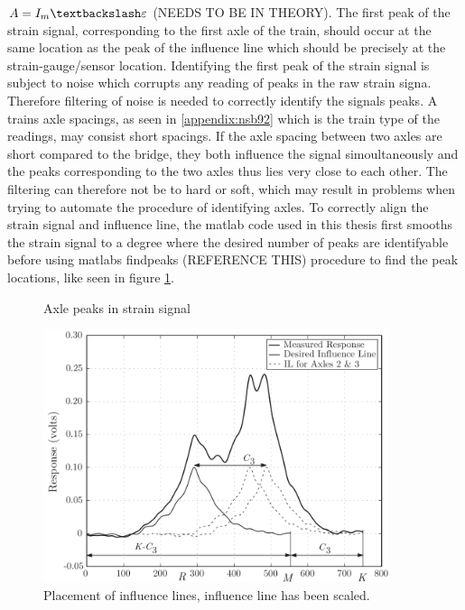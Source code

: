 $A = I_m \textbackslash \varepsilon$
(NEEDS TO BE IN THEORY).
The first peak of the strain signal, corresponding to the first axle of the train, should occur at the same location as the peak of the influence line which should be precisely at the strain-gauge/sensor location.
Identifying the first peak of the strain signal is subject to noise which corrupts any reading of peaks in the raw strain signa. Therefore filtering of noise is needed to correctly identify the signals peaks. A trains axle spacings, as seen in \ref{appendix:nsb92} which is the train type of the readings, may consist short spacings. If the axle spacing between two axles are short compared to the bridge, they both influence the signal simoultaneously and the peaks corresponding to the two axles thus lies very close to each other. The filtering can therefore not be to hard or soft, which may result in problems when trying to automate the procedure of identifying axles.
To correctly align the strain signal and influence line, the matlab code used in this thesis first smooths the strain signal to a degree where the desired number of peaks are identifyable before using matlabs findpeaks (REFERENCE THIS) procedure to find the peak locations, like seen in figure \ref{fig:axle_peaks}.
\begin{figure}[htbp]
	\begin{adjustbox}{center}
		
	\end{adjustbox}
	\caption{Axle peaks in strain signal}
	\label{fig:axle_peaks}
\end{figure}
\begin{figure}[htbp]
	\begin{adjustbox}{center}
		\includegraphics[width=0.9\textwidth]{figures/strain_vs_influenceline}
	\end{adjustbox}
	\caption{Placement of influence lines, influence line has been scaled.}
	\label{fig:strain_vs_influenceLine}
\end{figure}

